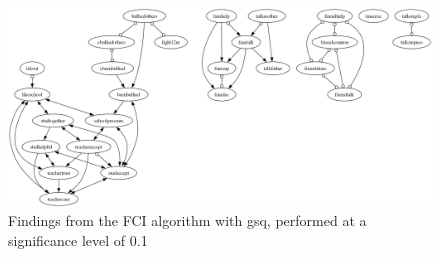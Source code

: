 \begin{figure}[htbp]
    \centering
    \includegraphics[width=1\textwidth]{Report/final_report/pictures/FCI_gsq_0.1__for time experiment.png}
    \caption{Findings from the FCI algorithm with gsq, performed at a significance level of 0.1}
    \label{fig:fci_gsq_0.1_for time experiment}
\end{figure}
